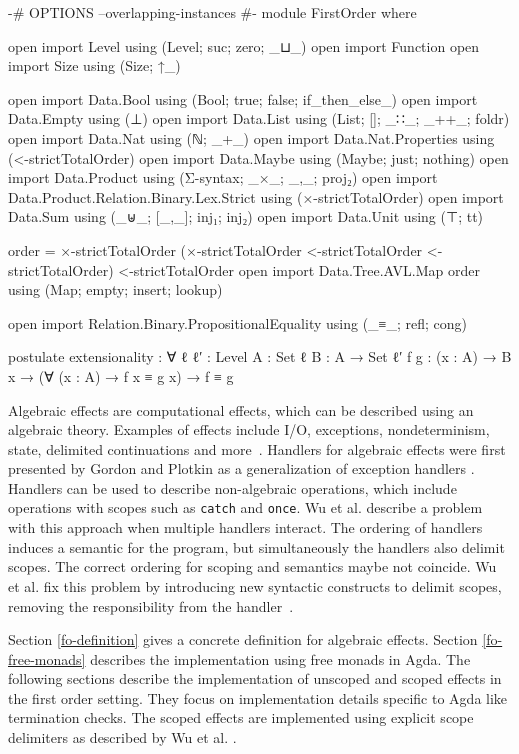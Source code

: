 \begin{code}[hide]
{-# OPTIONS --overlapping-instances #-}
module FirstOrder where

open import Level using (Level; suc; zero; _⊔_)
open import Function
open import Size using (Size; ↑_)

open import Data.Bool using (Bool; true; false; if_then_else_)
open import Data.Empty using (⊥)
open import Data.List using (List; []; _∷_; _++_; foldr)
open import Data.Nat using (ℕ; _+_)
open import Data.Nat.Properties using (<-strictTotalOrder)
open import Data.Maybe using (Maybe; just; nothing)
open import Data.Product using (Σ-syntax; _×_; _,_; proj₂)
open import Data.Product.Relation.Binary.Lex.Strict using (×-strictTotalOrder)
open import Data.Sum using (_⊎_; [_,_]; inj₁; inj₂)
open import Data.Unit using (⊤; tt)

order = ×-strictTotalOrder (×-strictTotalOrder <-strictTotalOrder <-strictTotalOrder) <-strictTotalOrder
open import Data.Tree.AVL.Map order using (Map; empty; insert; lookup)

open import Relation.Binary.PropositionalEquality using (_≡_; refl; cong)

postulate
  extensionality : ∀ {ℓ ℓ′ : Level} {A : Set ℓ} {B : A → Set ℓ′} {f g : (x : A) → B x}
      → (∀ (x : A) → f x ≡ g x) → f ≡ g
\end{code}


Algebraic effects are computational effects, which can be described using an
algebraic theory.
Examples of effects include I/O, exceptions, nondeterminism, state, delimited
continuations and more~\cite{DBLP:journals/corr/abs-1807-05923}.
Handlers for algebraic effects were first presented by Gordon and Plotkin
as a generalization of exception handlers \cite{}. %
Handlers can be used to describe non-algebraic operations, which include
operations with scopes such as \texttt{catch} and \texttt{once}.
Wu et al. describe a problem with this approach when multiple handlers
interact.
The ordering of handlers induces a semantic for the program, but simultaneously
the handlers also delimit scopes.
The correct ordering for scoping and semantics maybe not coincide.
Wu et al. fix this problem by introducing new syntactic constructs to delimit
scopes, removing the responsibility from the
handler~\cite{DBLP:conf/haskell/WuSH14,DBLP:conf/lics/PirogSWJ18}.

Section \ref{fo-definition} gives a concrete definition for algebraic effects.
Section \ref{fo-free-monads} describes the implementation using free monads in
Agda.
The following sections describe the implementation of unscoped and scoped
effects in the first order setting.
They focus on implementation details specific to Agda like termination checks.
The scoped effects are implemented using explicit scope delimiters as described
by Wu et al. \cite{DBLP:conf/haskell/WuSH14}.

